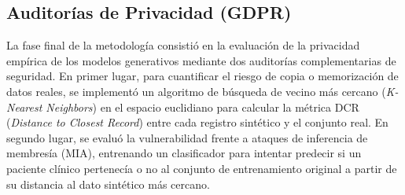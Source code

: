 \subsection{Auditorías de Privacidad (GDPR)}
La fase final de la metodología consistió en la evaluación de la privacidad empírica de los modelos generativos mediante dos auditorías complementarias de seguridad. En primer lugar, para cuantificar el riesgo de copia o memorización de datos reales, se implementó un algoritmo de búsqueda de vecino más cercano (\textit{K-Nearest Neighbors}) en el espacio euclidiano para calcular la métrica DCR (\textit{Distance to Closest Record}) entre cada registro sintético y el conjunto real. En segundo lugar, se evaluó la vulnerabilidad frente a ataques de inferencia de membresía (MIA), entrenando un clasificador para intentar predecir si un paciente clínico pertenecía o no al conjunto de entrenamiento original a partir de su distancia al dato sintético más cercano.
